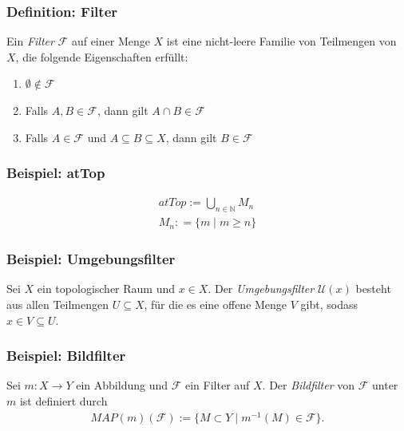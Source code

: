 \documentclass{beamer}
\begin{document}
\begin{frame}
    \frametitle{Definition: Filter}
    Ein \emph{Filter} $\mathcal{F}$ auf einer Menge $X$ ist eine nicht-leere Familie von Teilmengen von $X$, die folgende Eigenschaften erfüllt:
    \begin{enumerate}
        \item $\emptyset \notin \mathcal{F}$
        \item Falls $A, B \in \mathcal{F}$, dann gilt $A \cap B \in \mathcal{F}$
        \item Falls $A \in \mathcal{F}$ und $A \subseteq B \subseteq X$, dann gilt $B \in \mathcal{F}$
    \end{enumerate}
\end{frame}


\begin{frame}
    \frametitle{Beispiel: atTop}
   
    \begin{align}
        atTop := \bigcup_{n \in \mathbb{N}} M_n  \\
        M_n : = \{ m    \mid m \geq n\}
    \end{align}
\end{frame}


\begin{frame}
    \frametitle{Beispiel: Umgebungsfilter}
    Sei $X$ ein topologischer Raum und $x \in X$. Der \emph{Umgebungsfilter} $\mathcal{U}(x)$ besteht aus allen Teilmengen $U \subseteq X$, für die es eine offene Menge $V$ gibt, sodass $x \in V \subseteq U$.
\end{frame}


\begin{frame}
    \frametitle{Beispiel: Bildfilter}
    Sei $m: X \to Y  $ ein Abbildung und $\mathcal{F}$ ein Filter auf $X$. Der \emph{Bildfilter} von $\mathcal{F}$ unter $m$ ist definiert durch 
    \begin{align}
        MAP(m)(\mathcal{F}) := \{ M \subset Y \mid m^{-1} (M) \in \mathcal{F} \}.
    \end{align}
\end{frame}
\end{document}
